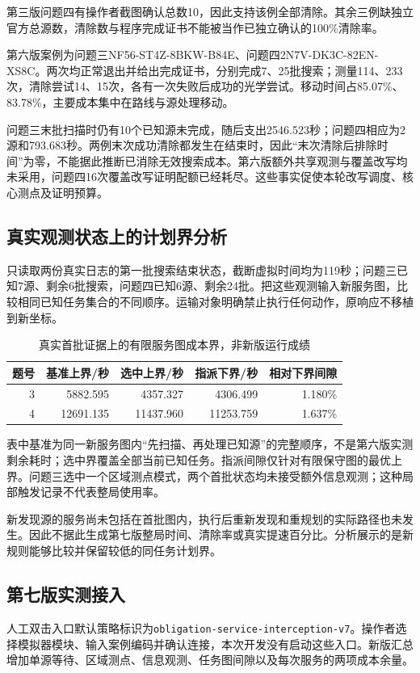 \documentclass[UTF8,a4paper,zihao=-4,fontset=windows]{ctexart}
\begin{document}
第三版问题四有操作者截图确认总数10，因此支持该例全部清除。其余三例缺独立官方总源数，清除数与程序完成证书不能被当作已独立确认的100\%清除率。

第六版案例为问题三NF56-ST4Z-8BKW-B84E、问题四2N7V-DK3C-82EN-XS8C。两次均正常退出并给出完成证书，分别完成7、25批搜索；测量114、233次，清除尝试14、15次，各有一次失败后成功的光学尝试。移动时间占85.07\%、83.78\%，主要成本集中在路线与源处理移动。

问题三末批扫描时仍有10个已知源未完成，随后支出2546.523秒；问题四相应为2源和793.683秒。两例末次成功清除都发生在结束时，因此“末次清除后排除时间”为零，不能据此推断已消除无效搜索成本。第六版额外共享观测与覆盖改写均未采用，问题四16次覆盖改写证明配额已经耗尽。这些事实促使本轮改写调度、核心测点及证明预算。

\subsection{真实观测状态上的计划界分析}
只读取两份真实日志的第一批搜索结束状态，截断虚拟时间均为119秒；问题三已知7源、剩余6批搜索，问题四已知6源、剩余24批。把这些观测输入新服务图，比较相同已知任务集合的不同顺序。运输对象明确禁止执行任何动作，原响应不移植到新坐标。
\begin{table}[htbp]\centering\small
\caption{真实首批证据上的有限服务图成本界，非新版运行成绩}
\begin{tabular}{rrrrr}\toprule
题号&基准上界/秒&选中上界/秒&指派下界/秒&相对下界间隙\\\midrule
3&5882.595&4357.327&4306.499&1.180\%\\
4&12691.135&11437.960&11253.759&1.637\%\\
\bottomrule\end{tabular}\end{table}

表中基准为同一新服务图内“先扫描、再处理已知源”的完整顺序，不是第六版实测剩余耗时；选中界覆盖全部当前已知任务。指派间隙仅针对有限保守图的最优上界。问题三选中一个区域测点模式，两个首批状态均未接受额外信息观测；这种局部触发记录不代表整局使用率。

新发现源的服务尚未包括在首批图内，执行后重新发现和重规划的实际路径也未发生。因此不据此生成第七版整局时间、清除率或真实提速百分比。分析展示的是新规则能够比较并保留较低的同任务计划界。

\subsection{第七版实测接入}
人工双击入口默认策略标识为\texttt{obligation-service-interception-v7}。操作者选择模拟器模块、输入案例编码并确认连接，本次开发没有启动这些入口。新版汇总增加单源等待、区域测点、信息观测、任务图间隙以及每次服务的两项成本余量。
\end{document}
